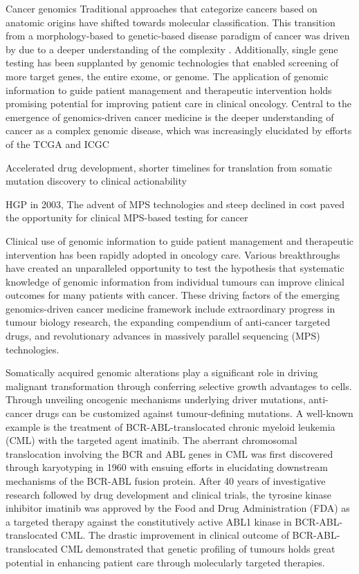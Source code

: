 Cancer genomics Traditional approaches that categorize cancers based on anatomic origins have shifted towards molecular classification. This transition from a morphology-based to genetic-based disease paradigm of cancer was driven by due to a deeper understanding of the complexity . Additionally, single gene testing has been supplanted by genomic technologies that enabled screening of more target genes, the entire exome, or genome. The application of genomic information to guide patient management and therapeutic intervention holds promising potential for improving patient care in clinical oncology. Central to the emergence of genomics-driven cancer medicine is the deeper understanding of cancer as a complex genomic disease, which was increasingly elucidated by efforts of the TCGA and ICGC

Accelerated drug development, shorter timelines for translation from somatic mutation discovery to clinical actionability

HGP in 2003, The advent of MPS technologies and steep declined in cost paved the opportunity for clinical MPS-based testing for cancer



Clinical use of genomic information to guide patient management and therapeutic intervention has been rapidly adopted in oncology care. Various breakthroughs have created an unparalleled opportunity to test the hypothesis that systematic knowledge of genomic information from individual tumours can improve clinical outcomes for many patients with cancer. These driving factors of the emerging genomics-driven cancer medicine framework include extraordinary progress in tumour biology research, the expanding compendium of anti-cancer targeted drugs, and revolutionary advances in massively parallel sequencing (MPS) technologies.

Somatically acquired genomic alterations play a significant role in driving malignant transformation through conferring selective growth advantages to cells. Through unveiling oncogenic mechanisms underlying driver mutations, anti-cancer drugs can be customized against tumour-defining mutations. A well-known example is the treatment of BCR-ABL-translocated chronic myeloid leukemia (CML) with the targeted agent imatinib. The aberrant chromosomal translocation involving the BCR and ABL genes in CML was first discovered through karyotyping in 1960 with ensuing efforts in elucidating downstream mechanisms of the BCR-ABL fusion protein. After 40 years of investigative research followed by drug development and clinical trials, the tyrosine kinase inhibitor imatinib was approved by the Food and Drug Administration (FDA) as a targeted therapy against the constitutively active ABL1 kinase in BCR-ABL-translocated CML. The drastic improvement in clinical outcome of BCR-ABL-translocated CML demonstrated that genetic profiling of tumours holds great potential in enhancing patient care through molecularly targeted therapies.

